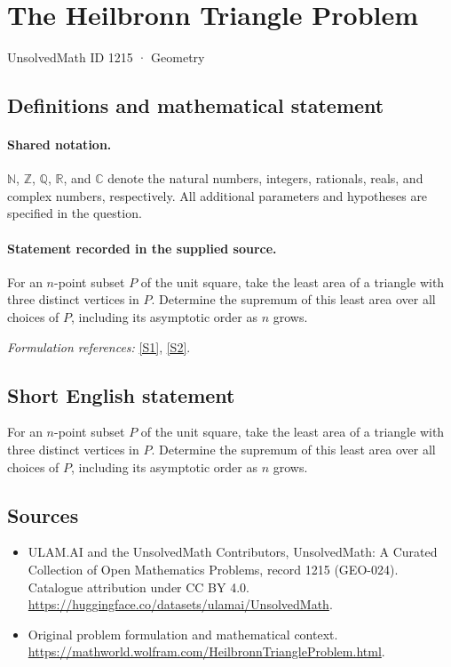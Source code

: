\documentclass[11pt]{article}
\newcommand{\sref}[2]{\hyperlink{source:#1:#2}{[S#2]}}
\begin{document}
\setcounter{section}{1214}
\section{The Heilbronn Triangle Problem}\label{1215}
{\small UnsolvedMath ID 1215 · Geometry}
\subsection{Definitions and mathematical statement}

\paragraph{Shared notation.}$\mathbb N$, $\mathbb Z$, $\mathbb Q$, $\mathbb R$, and $\mathbb C$ denote the natural numbers, integers, rationals, reals, and complex numbers, respectively. All additional parameters and hypotheses are specified in the question.


\paragraph{Statement recorded in the supplied source.}
For an $n$-point subset $P$ of the unit square, take the least area of a triangle with three distinct vertices in $P$. Determine the supremum of this least area over all choices of $P$, including its asymptotic order as $n$ grows.
\par\smallskip\textit{Formulation references:} \sref{1215}{1}, \sref{1215}{2}.
\subsection{Short English statement}
For an $n$-point subset $P$ of the unit square, take the least area of a triangle with three distinct vertices in $P$. Determine the supremum of this least area over all choices of $P$, including its asymptotic order as $n$ grows.
\subsection{Sources}
\begin{itemize}
\item[\hypertarget{source:1215:1}{S1}] ULAM.AI and the UnsolvedMath Contributors, UnsolvedMath: A Curated Collection of Open Mathematics Problems, record 1215 (GEO-024). Catalogue attribution under CC BY 4.0.
\url{https://huggingface.co/datasets/ulamai/UnsolvedMath}.
\item[\hypertarget{source:1215:2}{S2}] Original problem formulation and mathematical context.
\url{https://mathworld.wolfram.com/HeilbronnTriangleProblem.html}.
\end{itemize}
\label{end:1215}
\end{document}
